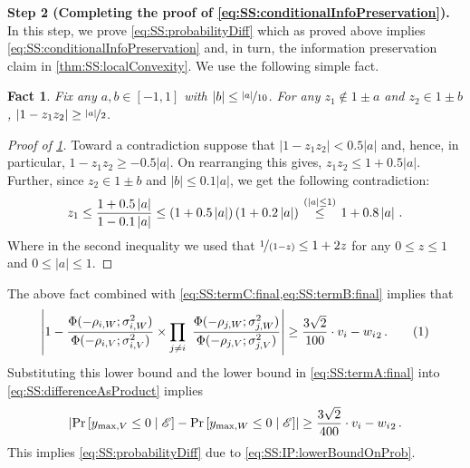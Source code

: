 \documentclass[11pt,letterpaper]{article}
\theoremstyle{plain}
\newtheorem{fact}[theorem]{Fact}
\theoremstyle{definition}
\theoremstyle{remark}
\newcommand{\yesnum}{\addtocounter{equation}{1}\tag{\theequation}}
\newcommand{\Stackrel}[2]{\stackrel{\mathmakebox[\widthof{\ensuremath{#2}}]{#1}}{#2}}
\def\abs#1{\left| #1 \right|}
\newcommand{\sinparen}[1]{\ensuremath{(#1)}}
\newcommand{\inparen}[1]{\ensuremath{\left(#1\right)}}
\newcommand{\insquare}[1]{\ensuremath{\left[#1\right]}}
\let\norm\relax
\newcommand{\norm}[1]{\ensuremath{\left\lVert #1 \right\rVert}}
\newcommand{\evE}{\ensuremath{\mathscr{E}}}
\newcommand{\nfrac}[2]{\nicefrac{#1}{#2}}
\renewcommand{\paragraph}[1]{\medskip \noindent\textbf{#1}~}
\newcommand{\customcdf}[2]{\Phi\sinparen{#1; \sigma_{#2}^2}}
\begin{document}
{{    
    \paragraph{Step 2 (Completing the proof of \cref{eq:SS:conditionalInfoPreservation}).}
        In this step, we prove \cref{eq:SS:probabilityDiff} which {as proved above} implies \cref{eq:SS:conditionalInfoPreservation} {and, in turn, the information preservation claim in \cref{thm:SS:localConvexity}}.
        We use the following simple fact.
        \begin{fact}\label{fact:simpleInequality}
            Fix any $a,b\in [-1,1]$ with $\abs{b}\leq \nfrac{\abs{a}}{10}$.
            For any $z_1\notin 1\pm a$ and $z_2\in 1\pm b$, $\abs{1 - z_1z_2}\geq \nfrac{\abs{a}}{2}$.
        \end{fact}
        \begin{proof}[Proof of \cref{fact:simpleInequality}]
            Toward a contradiction suppose that $\abs{1 - z_1z_2} < 0.5\abs{a}$ and, hence, in particular, $1-z_1z_2\geq -0.5\abs{a}$.
            On rearranging this gives, $z_1z_2\leq 1+0.5\abs{a}$.
            Further, since $z_2\in 1\pm b$ and $\abs{b}\leq 0.1\abs{a}$, we get the following contradiction:
            \[
                z_1 \leq \frac{1 + 0.5\abs{a}}{1-0.1\abs{a}}
                \leq \inparen{1 + 0.5\abs{a}}\inparen{1 + 0.2\abs{a}}
                \quad\Stackrel{(\abs{a}\leq 1)}{\leq}\quad 1 + 0.8\abs{a}\,.
            \]
            Where in the second inequality we used that $\nfrac{1}{(1-z)}\leq 1+2z$ for any $0\leq z\leq 1$ and $0\leq \abs{a}\leq 1$.
        \end{proof}
        The above fact combined with \cref{eq:SS:termC:final,eq:SS:termB:final} implies that 
    \begin{align*}
        \abs{
            1 - 
            \frac{
                \customcdf{-\rho_{i,W}}{i,W}
            }{
                \customcdf{-\rho_{i,V}}{i,V}
            }
            \times 
            \prod_{j\neq i}~ \frac{
                \customcdf{-\rho_{j,W}}{j,W}
            }{
                \customcdf{-\rho_{j,V}}{j,V}
            }
        }
        \geq  
        \frac{3\sqrt{2}}{100} \cdot \norm{v_i-w_i}_2\,.
        \yesnum\label{eq:SS:secondTermLB}
    \end{align*}
    Substituting this lower bound and the lower bound in \cref{eq:SS:termA:final} into \cref{eq:SS:differenceAsProduct} implies 
    \[
        \abs{
            \Pr\insquare{y_{\max, V} \leq 0\mid \evE}
            -
            \Pr\insquare{y_{\max, W} \leq 0\mid \evE}
        }
        \geq \frac{3\sqrt{2}}{400} \cdot \norm{v_i-w_i}_2\,.
    \]
    This implies \cref{eq:SS:probabilityDiff} due to \cref{eq:SS:IP:lowerBoundOnProb}.

}}
\end{document}
